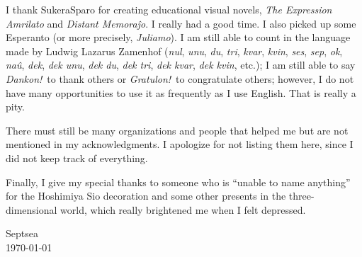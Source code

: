 I thank Sukera\-Sparo for creating educational visual novels,
\textit{The Expression Amrilato}\cite{%
    SukeraSparo:TheExpressionAmrilato}
and \textit{Distant Memora\^jo}\cite{%
    SukeraSparo:DistantMemorajxo}.
I really had a good time.
I also picked up some Esperanto
(or more precisely, \textit{Juliamo}).
I am still able to count in the language
made by Ludwig Lazarus Zamenhof
(\textit{nul}, \textit{unu}, \textit{du}, \textit{tri},
\textit{kvar}, \textit{kvin}, \textit{ses}, \textit{sep},
\textit{ok}, \textit{na\^u}, \textit{dek}, \textit{dek unu},
\textit{dek du}, \textit{dek tri},
\textit{dek kvar}, \textit{dek kvin},
etc.);
I am still able to say \textit{Dankon!}\ to thank others
or \textit{Gratulon!}\ to congratulate others;
however, I do not have many opportunities
to use it as frequently as I use English.
That is really a pity.

There must still be many organizations and people
that helped me but are not mentioned in my acknowledgments.
I apologize for not listing them here,
since I did not keep track of everything.

Finally, I give my special thanks to someone
who is ``unable to name anything''
for the Hoshimiya Sio decoration
and some other presents in the three-dimensional world,
which really brightened me when I felt depressed.

\begin{flushright}
    Septsea\\
    \today
\end{flushright}
